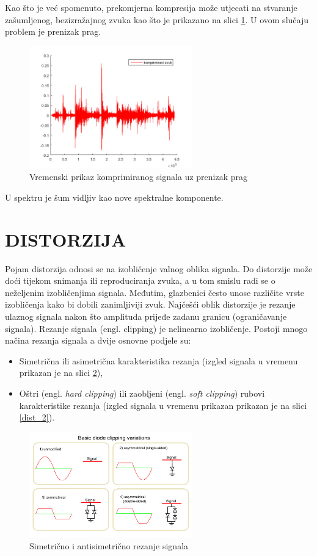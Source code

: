 \documentclass[conference]{IEEEtran}
\begin{document}
Kao što je već spomenuto, prekomjerna kompresija može utjecati na stvaranje zašumljenog, bezizražajnog
zvuka kao što je prikazano na slici \ref{komp_sum}. U ovom slučaju problem je prenizak prag.

\begin{figure}[H]
    \includegraphics[width=200pt]{slike/prenizak_prag.jpg}
    \centering
    \caption{Vremenski prikaz komprimiranog signala uz prenizak prag}
    \label{komp_sum}
\end{figure}

U spektru je šum vidljiv kao nove spektralne komponente.

\section{DISTORZIJA}

Pojam distorzija odnosi se na izobličenje valnog oblika signala. Do distorzije može doći tijekom snimanja 
ili reproduciranja zvuka, a u tom smislu radi se o neželjenim izobličenjima signala. Međutim, glazbenici 
često unose različite vrste izobličenja kako bi dobili zanimljiviji zvuk. Najčešći oblik distorzije je 
rezanje ulaznog signala nakon što amplituda prijeđe zadanu granicu (ograničavanje signala).
Rezanje signala (engl. clipping) je nelinearno izobličenje. Postoji mnogo načina rezanja signala a dvije 
osnovne podjele su: 

\begin{itemize}
  \item{Simetrična ili asimetrična karakteristika rezanja (izgled signala u vremenu prikazan je na slici 
    \ref{dist_1})},
  \item{Oštri (engl. \textit{hard clipping}) ili zaobljeni (engl. \textit{soft clipping}) rubovi karakteristike 
  rezanja (izgled signala u vremenu prikazan prikazan je na slici \ref{dist_2})}.
\end{itemize}

\begin{figure}[H]
    \includegraphics[width=200pt]{slike/dist_diode_clip.jpg}
    \centering
    \caption{Simetrično i antisimetrično rezanje signala}
    \label{dist_1}
\end{figure}
\end{document}
